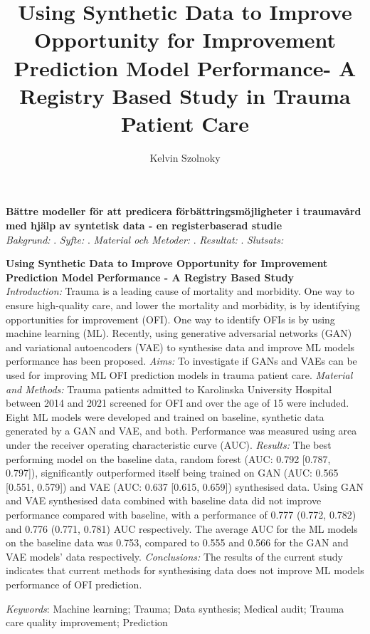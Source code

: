 \documentclass[12pt, a4paper]{article}
\author{Kelvin Szolnoky}
\title{Using Synthetic Data to Improve Opportunity for Improvement Prediction Model Performance- A Registry Based Study in Trauma Patient Care}
\begin{document}
\begin{titlepage}
	
\end{titlepage}
\fontsize{11}{13}\selectfont


\textbf{Bättre modeller för att predicera förbättringsmöjligheter i traumavård med hjälp av syntetisk data - en registerbaserad studie} \\
\textit{Bakgrund:} . \textit{Syfte:} . \textit{Material och Metoder:} . \textit{Resultat:} . \textit{Slutsats:}
\vfill

\textbf{Using Synthetic Data to Improve Opportunity for Improvement Prediction Model Performance - A Registry Based Study } \\
\textit{Introduction:} Trauma is a leading cause of mortality and morbidity. One way to ensure high-quality care, and lower the mortality and morbidity, is by identifying opportunities for improvement (OFI). One way to identify OFIs is by using machine learning (ML). Recently, using generative adversarial networks (GAN) and variational autoencoders (VAE) to synthesise data and improve ML models performance has been proposed. \textit{Aims:} To investigate if GANs and VAEs can be used for improving ML OFI prediction models in trauma patient care. \textit{Material and Methods:} Trauma patients admitted to Karolinska University Hospital between 2014 and 2021 screened for OFI and over the age of 15 were included. Eight ML models were developed and trained on baseline, synthetic data generated by a GAN and VAE, and both. Performance was measured using area under the receiver operating characteristic curve (AUC). \textit{Results:} The best performing model on the baseline data, random forest (AUC: 0.792 [0.787, 0.797]), significantly outperformed itself being trained on GAN (AUC: 0.565 [0.551, 0.579]) and VAE (AUC: 0.637 [0.615, 0.659]) synthesised data. Using GAN and VAE synthesised data combined with baseline data did not improve performance compared with baseline, with a performance of 0.777 (0.772, 0.782) and 0.776 (0.771, 0.781) AUC respectively. The average AUC for the ML models on the baseline data was 0.753, compared to 0.555 and 0.566 for the GAN and VAE models' data respectively. \textit{Conclusions:} The results of the current study indicates that current methods for synthesising data does not improve ML models performance of OFI prediction.
\vfill

\textit{Keywords}: Machine learning; Trauma; Data synthesis; Medical audit; Trauma care quality improvement; Prediction
\end{document}
